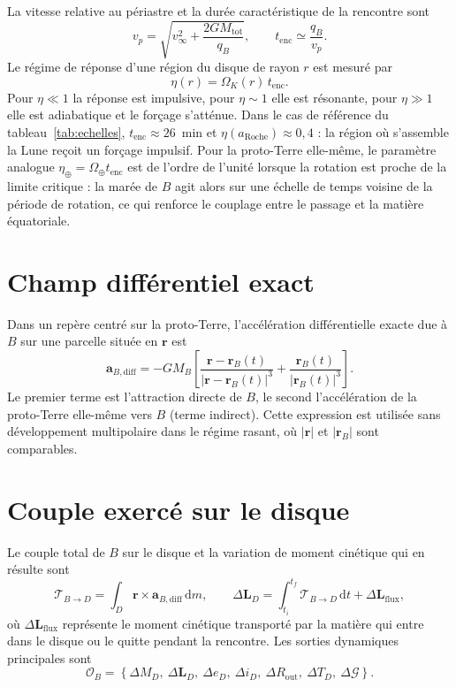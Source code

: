 \documentclass[11pt,a4paper,openany]{report}
\newcommand{\aR}{a_{\mathrm{Roche}}}
\newcommand{\dd}{\mathrm{d}}
\newcommand{\Mtot}{M_{\mathrm{tot}}}
\begin{document}
La vitesse relative au périastre et la durée caractéristique de la rencontre sont
\begin{equation}
v_p=\sqrt{v_\infty^2+\frac{2G\Mtot}{q_B}},
\qquad
t_{\mathrm{enc}}\simeq\frac{q_B}{v_p}.
\label{eq:tenc}
\end{equation}
Le régime de réponse d'une région du disque de rayon $r$ est mesuré par
\begin{equation}
\eta(r)=\Omega_K(r)\,t_{\mathrm{enc}}.
\label{eq:eta}
\end{equation}
Pour $\eta\ll1$ la réponse est impulsive, pour $\eta\sim1$ elle est résonante, pour $\eta\gg1$
elle est adiabatique et le forçage s'atténue. Dans le cas de référence du
tableau~\ref{tab:echelles}, $t_{\mathrm{enc}}\approx26$~min et $\eta(\aR)\approx0{,}4$ : la région
où s'assemble la Lune reçoit un forçage impulsif. Pour la proto-Terre elle-même, le paramètre
analogue $\eta_\oplus=\Omega_\oplus t_{\mathrm{enc}}$ est de l'ordre de l'unité lorsque la rotation
est proche de la limite critique : la marée de $B$ agit alors sur une échelle de temps voisine de
la période de rotation, ce qui renforce le couplage entre le passage et la matière équatoriale.

\section{Champ différentiel exact}

Dans un repère centré sur la proto-Terre, l'accélération différentielle exacte due à $B$ sur une
parcelle située en $\mathbf{r}$ est
\begin{equation}
\mathbf{a}_{B,\mathrm{diff}}=-GM_B\left[
\frac{\mathbf{r}-\mathbf{r}_B(t)}{|\mathbf{r}-\mathbf{r}_B(t)|^3}
+\frac{\mathbf{r}_B(t)}{|\mathbf{r}_B(t)|^3}\right].
\label{eq:adiff}
\end{equation}
Le premier terme est l'attraction directe de $B$, le second l'accélération de la proto-Terre
elle-même vers $B$ (terme indirect). Cette expression est utilisée sans développement
multipolaire dans le régime rasant, où $|\mathbf{r}|$ et $|\mathbf{r}_B|$ sont comparables.

\section{Couple exercé sur le disque}

Le couple total de $B$ sur le disque et la variation de moment cinétique qui en résulte sont
\begin{equation}
\boldsymbol{\mathcal{T}}_{B\to D}=\int_D\mathbf{r}\times\mathbf{a}_{B,\mathrm{diff}}\,\dd m,
\qquad
\Delta\mathbf{L}_D=\int_{t_i}^{t_f}\boldsymbol{\mathcal{T}}_{B\to D}\,\dd t+\Delta\mathbf{L}_{\mathrm{flux}},
\label{eq:couple}
\end{equation}
où $\Delta\mathbf{L}_{\mathrm{flux}}$ représente le moment cinétique transporté par la matière
qui entre dans le disque ou le quitte pendant la rencontre. Les sorties dynamiques principales
sont
\begin{equation}
\mathcal{O}_B=\left\{\Delta M_D,\ \Delta\mathbf{L}_D,\ \Delta e_D,\ \Delta i_D,\
\Delta R_{\mathrm{out}},\ \Delta T_D,\ \Delta\mathcal{G}\right\}.
\label{eq:OB}
\end{equation}
\end{document}
